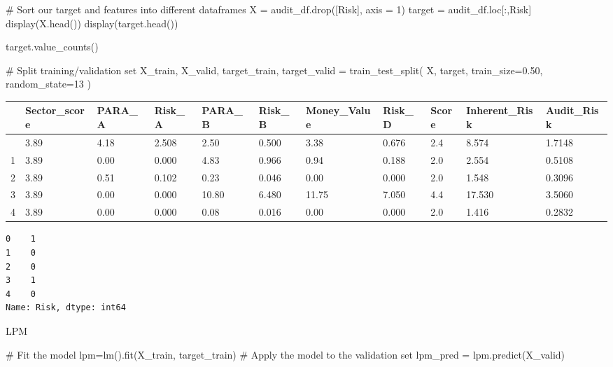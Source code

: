 \documentclass[
  11pt,
  letterpaper,
  DIV=11,
  numbers=noendperiod]{scrartcl}
\newenvironment{Shaded}{\begin{snugshade}}{\end{snugshade}}
\newcommand{\CommentTok}[1]{\textcolor[rgb]{0.37,0.37,0.37}{#1}}
\newcommand{\DecValTok}[1]{\textcolor[rgb]{0.68,0.00,0.00}{#1}}
\newcommand{\FloatTok}[1]{\textcolor[rgb]{0.68,0.00,0.00}{#1}}
\newcommand{\NormalTok}[1]{\textcolor[rgb]{0.00,0.23,0.31}{#1}}
\newcommand{\OperatorTok}[1]{\textcolor[rgb]{0.37,0.37,0.37}{#1}}
\newcommand{\StringTok}[1]{\textcolor[rgb]{0.13,0.47,0.30}{#1}}
\begin{document}
\begin{Shaded}
\begin{Highlighting}[]
\CommentTok{\# Sort our target and features into different dataframes}
\NormalTok{X }\OperatorTok{=}\NormalTok{ audit\_df.drop([}\StringTok{\textquotesingle{}Risk\textquotesingle{}}\NormalTok{], axis }\OperatorTok{=} \DecValTok{1}\NormalTok{)}
\NormalTok{target }\OperatorTok{=}\NormalTok{ audit\_df.loc[:,}\StringTok{\textquotesingle{}Risk\textquotesingle{}}\NormalTok{]}
\NormalTok{display(X.head())}
\NormalTok{display(target.head())}

\NormalTok{target.value\_counts()}

\CommentTok{\# Split training/validation set}
\NormalTok{X\_train, X\_valid, target\_train, target\_valid }\OperatorTok{=}\NormalTok{ train\_test\_split(}
\NormalTok{X, target, train\_size}\OperatorTok{=}\FloatTok{0.50}\NormalTok{, random\_state}\OperatorTok{=}\DecValTok{13}
\NormalTok{)}
\end{Highlighting}
\end{Shaded}

\begin{longtable}[]{@{}lllllllllll@{}}
\toprule\noalign{}
& Sector\_score & PARA\_A & Risk\_A & PARA\_B & Risk\_B & Money\_Value &
Risk\_D & Score & Inherent\_Risk & Audit\_Risk \\
\midrule\noalign{}
\endhead
\bottomrule\noalign{}
\endlastfoot
0 & 3.89 & 4.18 & 2.508 & 2.50 & 0.500 & 3.38 & 0.676 & 2.4 & 8.574 &
1.7148 \\
1 & 3.89 & 0.00 & 0.000 & 4.83 & 0.966 & 0.94 & 0.188 & 2.0 & 2.554 &
0.5108 \\
2 & 3.89 & 0.51 & 0.102 & 0.23 & 0.046 & 0.00 & 0.000 & 2.0 & 1.548 &
0.3096 \\
3 & 3.89 & 0.00 & 0.000 & 10.80 & 6.480 & 11.75 & 7.050 & 4.4 & 17.530 &
3.5060 \\
4 & 3.89 & 0.00 & 0.000 & 0.08 & 0.016 & 0.00 & 0.000 & 2.0 & 1.416 &
0.2832 \\
\end{longtable}

\begin{verbatim}
0    1
1    0
2    0
3    1
4    0
Name: Risk, dtype: int64
\end{verbatim}

LPM

\begin{Shaded}
\begin{Highlighting}[]
\CommentTok{\# Fit the model}
\NormalTok{lpm}\OperatorTok{=}\NormalTok{lm().fit(X\_train, target\_train)}
\CommentTok{\# Apply the model to the validation set}
\NormalTok{lpm\_pred }\OperatorTok{=}\NormalTok{ lpm.predict(X\_valid)}
\end{Highlighting}
\end{Shaded}
\end{document}
